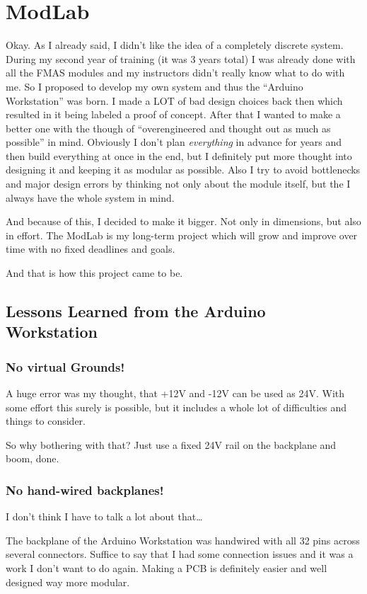 \chapter{ModLab}
Okay. As I already said, I didn't like the idea of a completely discrete system. During my second year of training (it was 3 years total) I was already done with all the FMAS modules and my instructors didn't really know what to do with me. So I proposed to develop my own system and thus the ``Arduino Workstation'' was born. I made a LOT of bad design choices back then which resulted in it being labeled a proof of concept. After that I wanted to make a better one with the though of ``overengineered and thought out as much as possible'' in mind. Obviously I don't plan \textit{everything} in advance for years and then build everything at once in the end, but I definitely put more thought into designing it and keeping it as modular as possible. Also I try to avoid bottlenecks and major design errors by thinking not only about the module itself, but the I always have the whole system in mind. 

And because of this, I decided to make it bigger. Not only in dimensions, but also in effort. The ModLab is my long-term project which will grow and improve over time with no fixed deadlines and goals. 

And that is how this project came to be.

\section{Lessons Learned from the Arduino Workstation}
\subsection{No virtual Grounds!}
A huge error was my thought, that +12V and -12V can be used as 24V. With some effort this surely is possible, but it includes a whole lot of difficulties and things to consider. 

So why bothering with that? Just use a fixed 24V rail on the backplane and boom, done.

\subsection{No hand-wired backplanes!}
I don't think I have to talk a lot about that\dots

The backplane of the Arduino Workstation was handwired with all 32 pins across several connectors. Suffice to say that I had some connection issues and it was a work I don't want to do again. Making a PCB is definitely easier and well designed way more modular. 

